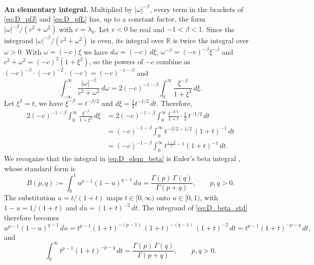\documentclass[12pt]{article}
\newcommand{\R}{\mathbb{R}}
\begin{document}
\textbf{An elementary integral.} Multiplied by $|\omega|^{-\beta}$, every term in the brackets of \eqref{eq:D_pfJ} and
\eqref{eq:D_pfL} has, up to a constant factor, the form $|\omega|^{-\beta}/(c^2+\omega^2)$ with $c=\lambda_k$. Let $c<0$ be real
and $-1<\beta<1$. Since the integrand $|\omega|^{-\beta}/(c^2+\omega^2)$ is even, its integral over $\R$ is twice the integral
over $\omega>0$. With $\omega=(-c)\xi$ we have $d\omega=(-c)\,d\xi$,
$\omega^{-\beta}=(-c)^{-\beta}\xi^{-\beta}$ and $c^2+\omega^2=(-c)^2(1+\xi^2)$, so the powers of $-c$ combine as
$(-c)^{-\beta}\cdot(-c)^{-2}\cdot(-c)=(-c)^{-1-\beta}$ and
\begin{equation}
    \int_{-\infty}^{\infty}\frac{|\omega|^{-\beta}}{c^2+\omega^2}\,d\omega
    =2(-c)^{-1-\beta}\int_0^\infty\frac{\xi^{-\beta}}{1+\xi^2}\,d\xi .
    \label{eq:D_elem_sub}
\end{equation}
Let $\xi^2=t$, we have $\xi^{-\beta}=t^{-\beta/2}$ and $d\xi=\frac12t^{-1/2}\,dt$. Therefore,
\begin{equation}
\begin{aligned}
    2(-c)^{-1-\beta}\int_0^\infty\frac{\xi^{-\beta}}{1+\xi^2}\,d\xi
    &=2(-c)^{-1-\beta}\int_0^\infty\frac{t^{-\beta/2}}{1+t}\cdot\frac12\,t^{-1/2}\,dt\\
    &=(-c)^{-1-\beta}\int_0^\infty t^{-\beta/2-1/2}\,(1+t)^{-1}\,dt\\
    &=(-c)^{-1-\beta}\int_0^\infty t^{\frac{1-\beta}{2}-1}(1+t)^{-1}\,dt.
\end{aligned}
    \label{eq:D_elem_beta}
\end{equation}
We recognize that the integral in \eqref{eq:D_elem_beta} is Euler's beta integral \href{https://press.princeton.edu/books/paperback/9780691113852/complex-analysis}{\citep{SteinShakarchi2003}}, whose standard form is
\begin{equation}
    B(p,q):=\int_0^1 u^{p-1}(1-u)^{q-1}\,du=\frac{\Gamma(p)\,\Gamma(q)}{\Gamma(p+q)},\qquad p,q>0.
    \label{eq:D_beta_std}
\end{equation}
The substitution $u=t/(1+t)$ maps $t\in[0,\infty)$ onto $u\in[0,1)$, with $1-u=1/(1+t)$ and $du=(1+t)^{-2}\,dt$. The
integrand of \eqref{eq:D_beta_std} therefore becomes
\begin{equation*}
    u^{p-1}(1-u)^{q-1}\,du
    =t^{p-1}(1+t)^{-(p-1)}\,(1+t)^{-(q-1)}\,(1+t)^{-2}\,dt
    =t^{p-1}(1+t)^{-p-q}\,dt,
\end{equation*}
and
\begin{equation}
    \int_0^\infty t^{p-1}(1+t)^{-p-q}\,dt=\frac{\Gamma(p)\,\Gamma(q)}{\Gamma(p+q)},\qquad p,q>0.
    \label{eq:D_betaint}
\end{equation}
\end{document}
